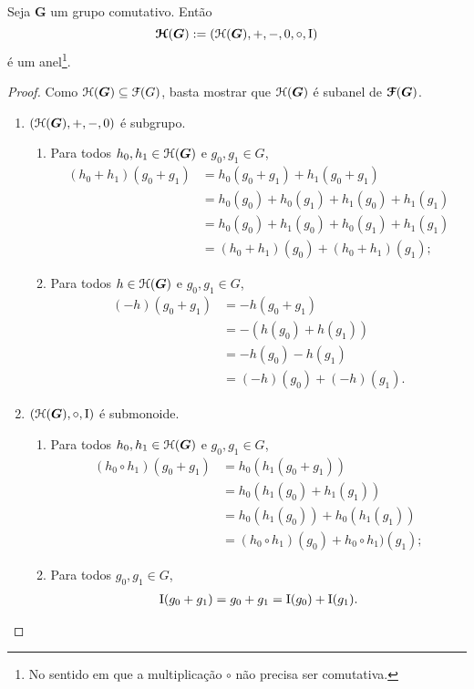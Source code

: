 \begin{proposition}
Seja $\bm G$ um grupo comutativo. Então
	\begin{equation*}
	\bm{\mathcal{H}}(\bm G) := (\mathcal{H}(\bm G),+,-,0,\circ,\mathrm{I})
	\end{equation*}
é um anel\footnote{No sentido em que a multiplicação $\circ$ não precisa ser comutativa.}.
\end{proposition}
\begin{proof}
Como $\mathcal{H}(\bm G) \subseteq \mathcal{F}(G)$, basta mostrar que $\mathcal{H}(\bm G)$ é subanel de $\bm{\mathcal{F}}(\bm G)$.
	\begin{enumerate}
	\item $(\mathcal{H}(\bm G),+,-,0)$ é subgrupo.
		\begin{enumerate}
		\item Para todos $h_0,h_1 \in \mathcal{H}(\bm G)$ e $g_0,g_1 \in G$,
			\begin{align*}
			(h_0+h_1)(g_0+g_1) &= h_0(g_0+g_1) + h_1(g_0+g_1) \\
				&= h_0(g_0) + h_0(g_1) + h_1(g_0) + h_1(g_1) \\
				&= h_0(g_0) + h_1(g_0) + h_0(g_1) + h_1(g_1) \\
				&= (h_0 + h_1)(g_0) + (h_0 + h_1)(g_1);
			\end{align*}
		\item Para todos $h \in \mathcal{H}(\bm G)$ e $g_0,g_1 \in G$,
			\begin{align*}
			(-h)(g_0+g_1) &= -h(g_0+g_1) \\
				&= -(h(g_0)+h(g_1)) \\
				&= -h(g_0)-h(g_1) \\
				&= (-h)(g_0)+(-h)(g_1).
			\end{align*}
		\end{enumerate}
	\item $(\mathcal{H}(\bm G),\circ,\mathrm{I})$ é submonoide.
		\begin{enumerate}
		\item Para todos $h_0,h_1 \in \mathcal{H}(\bm G)$ e $g_0,g_1 \in G$,
			\begin{align*}
			(h_0 \circ h_1)(g_0+g_1) &= h_0(h_1(g_0+g_1)) \\
				&= h_0(h_1(g_0)+h_1(g_1)) \\
				&= h_0(h_1(g_0))+h_0(h_1(g_1)) \\
				&= (h_0 \circ h_1)(g_0)+h_0 \circ h_1)(g_1);
			\end{align*}
		\item Para todos $g_0,g_1 \in G$,
			\begin{align*}
			\mathrm{I}(g_0+g_1) = g_0+g_1 = \mathrm{I}(g_0)+\mathrm{I}(g_1).
			\qedhere
			\end{align*}
		\end{enumerate}
	\end{enumerate}
\end{proof}

